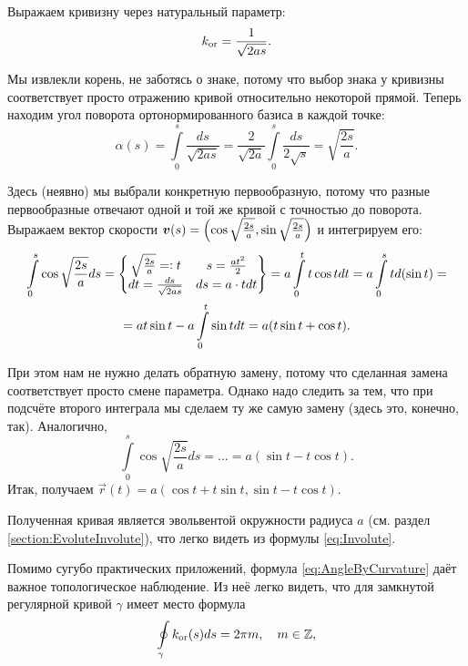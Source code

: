\begin{solution}
	Выражаем кривизну через натуральный параметр:
	\[
		k_{\mathrm{or}} = \frac{1}{\sqrt{2as}}.
	\]

	Мы извлекли корень, не заботясь о знаке, потому что выбор знака у кривизны соответствует просто отражению кривой относительно некоторой прямой. Теперь находим угол поворота ортонормированного базиса в каждой точке:
	\[
		\alpha(s) = \int\limits_0^s\frac{ds}{\sqrt{2as}} = \frac{2}{\sqrt{2a}}\int\limits_0^s\frac{ds}{2\sqrt{s}} = \sqrt{\frac{2s}{a}}.
	\]

	Здесь (неявно) мы выбрали конкретную первообразную, потому что разные первообразные отвечают одной и той же кривой с точностью до поворота. Выражаем вектор скорости $\boldsymbol{v}(s) = \left(\cos\sqrt{\frac{2s}{a}}, \sin\sqrt{\frac{2s}{a}}\right)$ и интегрируем его:
	\begin{multline*}
		\int\limits_0^s\cos\sqrt{\frac{2s}{a}}ds = \left\{
			\begin{matrix}
				\sqrt{\frac{2s}{a}} = \vcentcolon t & s = \frac{at^2}{2} \\
				dt = \frac{ds}{\sqrt{2as}} & ds = a \cdot t dt
			\end{matrix}
			\right\} = a\int\limits_0^tt\cos t dt = a\int\limits_0^std(\sin t) =\\ = a t\sin t - a\int\limits_0^t\sin tdt = a(t\sin t + \cos t).
	\end{multline*}

	При этом нам не нужно делать обратную замену, потому что сделанная замена соответствует просто смене параметра. Однако надо следить за тем, что при подсчёте второго интеграла мы сделаем ту же самую замену (здесь это, конечно, так). Аналогично,
	\[
		\int\limits_0^s\cos\sqrt{\frac{2s}{a}}ds = \ldots = a(\sin t - t\cos t).
	\]
	Итак, получаем $\vec{r}(t) = a(\cos t + t \sin t, \sin t - t \cos t)$.
\end{solution}

Полученная кривая является эвольвентой окружности радиуса $a$ (см. раздел \ref{section:EvoluteInvolute}), что легко видеть из формулы \eqref{eq:Involute}.

Помимо сугубо практических приложений, формула \eqref{eq:AngleByCurvature} даёт важное топологическое наблюдение. Из неё легко видеть, что для замкнутой регулярной кривой $\gamma$ имеет место формула
\begin{equation} \label{eq:HomoTopInvariant}
	\oint\limits_{\gamma}k_{\mathrm{or}}(s)ds = 2\pi m,\quad m \in \mathbb{Z},
\end{equation}

